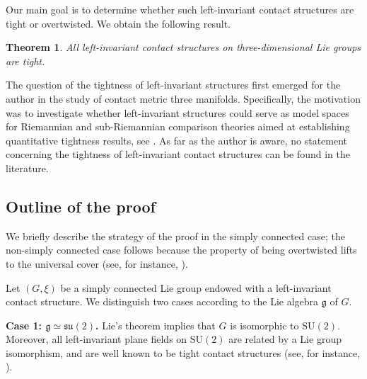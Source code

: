 \documentclass[reqno]{amsart}
\newtheorem{theorem}{Theorem}[section]
\theoremstyle{remark}
\theoremstyle{plain}
\begin{document}
Our main goal is to determine whether such left-invariant contact structures are tight or overtwisted. We obtain the following result. 

\begin{theorem}\label{thm:left-invariant-tight}
	All left-invariant contact structures on three-dimensional Lie groups are tight.
\end{theorem}

The question of the tightness of left-invariant structures first emerged for the author in the study of contact metric three manifolds. Specifically, the motivation was to investigate whether left-invariant structures could serve as model spaces for Riemannian and sub-Riemannian comparison theories aimed at establishing quantitative tightness results, see \cite{Massot,QDarboux,ABBR}.
As far as the author is aware, no statement concerning the tightness of left-invariant contact structures can be found in the literature.

\subsection{Outline of the proof}

We briefly describe the strategy of the proof in the simply connected case; the non-simply connected case follows because the property of being overtwisted lifts to the universal cover (see, for instance, \cite[Remark\, 2.6]{ABBR}).

Let \((G,\xi)\) be a simply connected Lie group endowed with a left-invariant contact structure. We distinguish two cases according to the Lie algebra \(\mathfrak g\) of \(G\).

\smallskip
\noindent
\textbf{Case 1: \(\mathfrak g \simeq \mathfrak{su}(2)\).}  
Lie's theorem implies that \(G\) is isomorphic to \(\mathrm{SU}(2)\). Moreover, all left-invariant plane fields on \(\mathrm{SU}(2)\) are related by a Lie group isomorphism, and are well known to be tight contact structures (see, for instance, \cite{Massot-LectureNotes}). 
\end{document}
